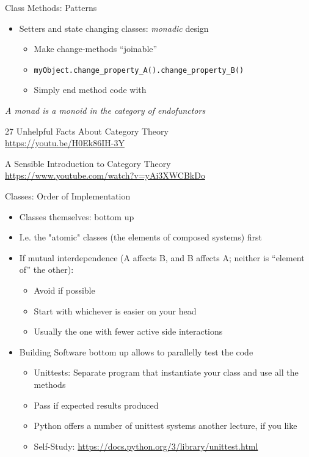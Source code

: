 \begin{frame}{Class Methods: Patterns}
%
\begin{itemize}
\item Setters and state changing classes: \emph{monadic} design
	\begin{itemize}
	\item Make change-methods \enquote{joinable}
	\item \texttt{myObject.change\_property\_A().change\_property\_B()}
	\item Simply end method code with 
	\end{itemize}
\end{itemize}
%
\begin{hintbox}
\emph{A monad is a monoid in the category of endofunctors}

\vspace{6pt}
27 Unhelpful Facts About Category Theory\\
\url{https://youtu.be/H0Ek86IH-3Y}

\vspace{6pt}
A Sensible Introduction to Category Theory\\
\url{https://www.youtube.com/watch?v=yAi3XWCBkDo}
\end{hintbox}
%
\end{frame}


\begin{frame}{Classes: Order of Implementation}
%
\begin{itemize}
\item Classes themselves: bottom up
\item I.\;e. the "atomic" classes (the elements of composed systems) first
\item If mutual interdependence (A affects B, and B affects A; neither is \enquote{element of} the other):
	\begin{itemize}
	\item Avoid if possible
	\item Start with whichever is easier on your head
	\item Usually the one with fewer active side interactions
	\end{itemize}
\item Building Software bottom up allows to parallelly test the code
	\begin{itemize}
	\item Unittests: Separate program that instantiate your class and use all the methods
	\item Pass if expected results produced
	\item Python offers a number of unittest systems \Thus another lecture, if you like
	\item Self-Study: \url{https://docs.python.org/3/library/unittest.html}
	\end{itemize}
\end{itemize}
%
\end{frame}

